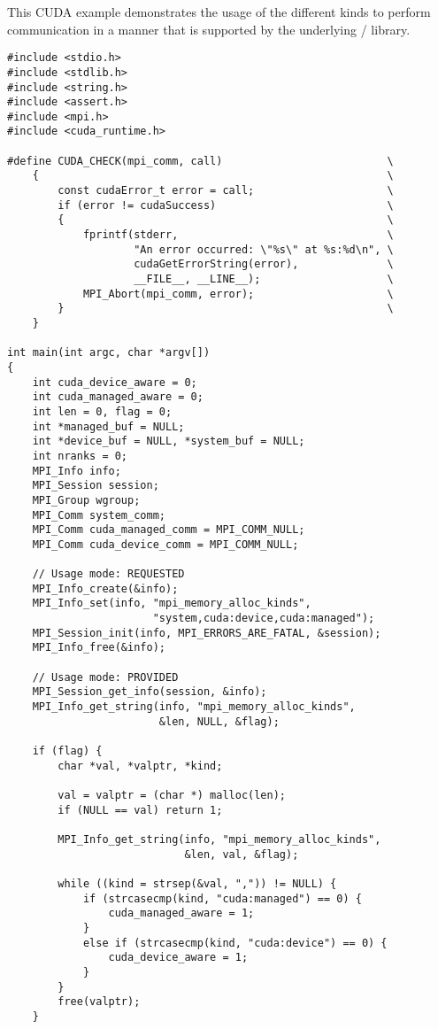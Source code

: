 \begin{example}
\label{example:alloc-kind-spm-cuda}
This CUDA example demonstrates the usage of the different
kinds to perform communication in a manner that is supported
by the underlying \mpi/ library.
\begin{lstlisting}[language={[MPI]C}]
#include <stdio.h>
#include <stdlib.h>
#include <string.h>
#include <assert.h>
#include <mpi.h>
#include <cuda_runtime.h>

#define CUDA_CHECK(mpi_comm, call)                          \
    {                                                       \
        const cudaError_t error = call;                     \
        if (error != cudaSuccess)                           \
        {                                                   \
            fprintf(stderr,                                 \
                    "An error occurred: \"%s\" at %s:%d\n", \
                    cudaGetErrorString(error),              \
                    __FILE__, __LINE__);                    \
            MPI_Abort(mpi_comm, error);                     \
        }                                                   \
    }

int main(int argc, char *argv[])
{
    int cuda_device_aware = 0;
    int cuda_managed_aware = 0;
    int len = 0, flag = 0;
    int *managed_buf = NULL;
    int *device_buf = NULL, *system_buf = NULL;
    int nranks = 0;
    MPI_Info info;
    MPI_Session session;
    MPI_Group wgroup;
    MPI_Comm system_comm;
    MPI_Comm cuda_managed_comm = MPI_COMM_NULL;
    MPI_Comm cuda_device_comm = MPI_COMM_NULL;

    // Usage mode: REQUESTED
    MPI_Info_create(&info);
    MPI_Info_set(info, "mpi_memory_alloc_kinds",
                       "system,cuda:device,cuda:managed");
    MPI_Session_init(info, MPI_ERRORS_ARE_FATAL, &session);
    MPI_Info_free(&info);

    // Usage mode: PROVIDED
    MPI_Session_get_info(session, &info);
    MPI_Info_get_string(info, "mpi_memory_alloc_kinds",
                        &len, NULL, &flag);

    if (flag) {
        char *val, *valptr, *kind;

        val = valptr = (char *) malloc(len);
        if (NULL == val) return 1;

        MPI_Info_get_string(info, "mpi_memory_alloc_kinds",
                            &len, val, &flag);

        while ((kind = strsep(&val, ",")) != NULL) {
            if (strcasecmp(kind, "cuda:managed") == 0) {
                cuda_managed_aware = 1;
            }
            else if (strcasecmp(kind, "cuda:device") == 0) {
                cuda_device_aware = 1;
            }
        }
        free(valptr);
    }


\end{lstlisting}
\end{example}
